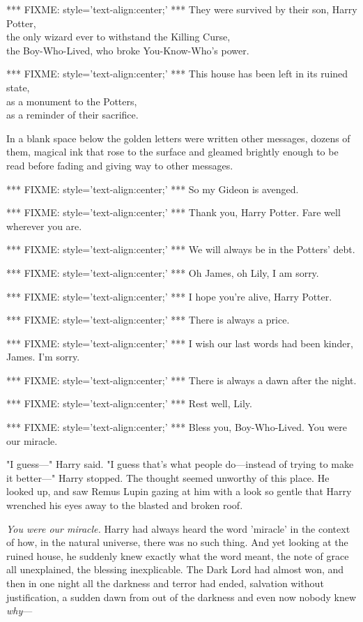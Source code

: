 *** FIXME: style='text-align:center;' ***
They were survived by their son, Harry Potter,\\
the only wizard ever to withstand the Killing Curse,\\
the Boy-Who-Lived, who broke You-Know-Who's power.

*** FIXME: style='text-align:center;' ***
This house has been left in its ruined state,\\
as a monument to the Potters,\\
as a reminder of their sacrifice.

In a blank space below the golden letters were written other messages, dozens 
of them, magical ink that rose to the surface and gleamed brightly enough to be 
read before fading and giving way to other messages.

*** FIXME: style='text-align:center;' ***
So my Gideon is avenged.

*** FIXME: style='text-align:center;' ***
Thank you, Harry Potter. Fare well wherever you are.

*** FIXME: style='text-align:center;' ***
We will always be in the Potters' debt.

*** FIXME: style='text-align:center;' ***
Oh James, oh Lily, I am sorry.

*** FIXME: style='text-align:center;' ***
I hope you're alive, Harry Potter.

*** FIXME: style='text-align:center;' ***
There is always a price.

*** FIXME: style='text-align:center;' ***
I wish our last words had been kinder, James. I'm sorry.

*** FIXME: style='text-align:center;' ***
There is always a dawn after the night.

*** FIXME: style='text-align:center;' ***
Rest well, Lily.

*** FIXME: style='text-align:center;' ***
Bless you, Boy-Who-Lived. You were our miracle.

"I guess---" Harry said. "I guess that's what people do---instead of trying to 
make it better---" Harry stopped. The thought seemed unworthy of this place. He 
looked up, and saw Remus Lupin gazing at him with a look so gentle that Harry 
wrenched his eyes away to the blasted and broken roof.

\emph{You were our miracle.} Harry had always heard the word 'miracle' in the 
context of how, in the natural universe, there was no such thing. And yet 
looking at the ruined house, he suddenly knew exactly what the word meant, the 
note of grace all unexplained, the blessing inexplicable. The Dark Lord had 
almost won, and then in one night all the darkness and terror had ended, 
salvation without justification, a sudden dawn from out of the darkness and 
even now nobody knew \emph{why}---

